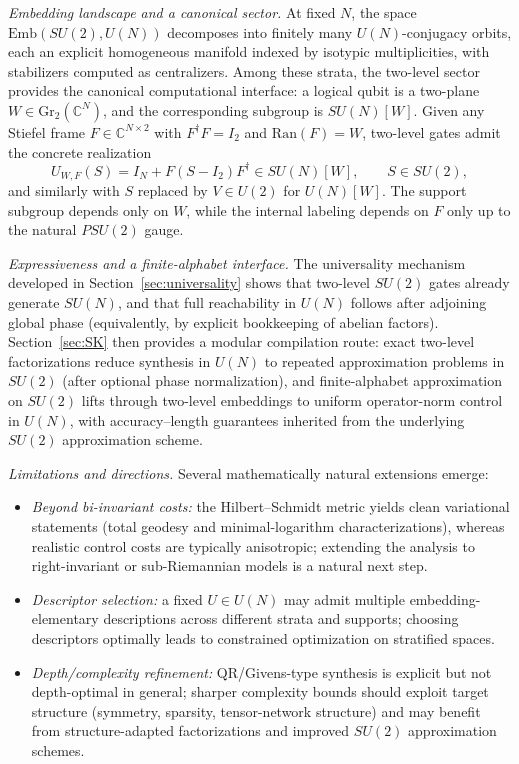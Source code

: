 \documentclass{article}%
\theoremstyle{definition}
\numberwithin{equation}{section}
\newcommand{\C}{\mathbb{C}}
\newcommand{\Gr}{\mathrm{Gr}}
\newcommand{\Emb}{\mathrm{Emb}}
\newcommand{\Ran}{\mathrm{Ran}}
\begin{document}
\smallskip
\noindent\emph{Embedding landscape and a canonical sector.}
At fixed $N$, the space $\Emb(SU(2),U(N))$ decomposes into finitely many $U(N)$-conjugacy orbits, each an explicit homogeneous manifold
indexed by isotypic multiplicities, with stabilizers computed as centralizers.
Among these strata, the two-level sector provides the canonical computational interface: a logical qubit is a two-plane
$W\in\Gr_2(\C^N)$, and the corresponding subgroup is $SU(N)[W]$.
Given any Stiefel frame $F\in\C^{N\times 2}$ with $F^\dagger F=I_2$ and $\Ran(F)=W$, two-level gates admit the concrete realization
\begin{equation}\label{eq:conclusion_two_level_realization}
U_{W,F}(S)=I_N+F(S-I_2)F^\dagger\in SU(N)[W],\qquad S\in SU(2),
\end{equation}
and similarly with $S$ replaced by $V\in U(2)$ for $U(N)[W]$.
The support subgroup depends only on $W$, while the internal labeling depends on $F$ only up to the natural $PSU(2)$ gauge.

\smallskip
\noindent\emph{Expressiveness and a finite-alphabet interface.}
The universality mechanism developed in Section~\ref{sec:universality} shows that two-level $SU(2)$ gates already generate $SU(N)$, and
that full reachability in $U(N)$ follows after adjoining global phase (equivalently, by explicit bookkeeping of abelian factors).
Section~\ref{sec:SK} then provides a modular compilation route: exact two-level factorizations reduce synthesis in $U(N)$ to repeated
approximation problems in $SU(2)$ (after optional phase normalization), and finite-alphabet approximation on $SU(2)$ lifts through
two-level embeddings to uniform operator-norm control in $U(N)$, with accuracy--length guarantees inherited from the underlying
$SU(2)$ approximation scheme.

\smallskip
\noindent\emph{Limitations and directions.}
Several mathematically natural extensions emerge:
\begin{itemize}
\item \emph{Beyond bi-invariant costs:} the Hilbert--Schmidt metric yields clean variational statements (total geodesy and
minimal-logarithm characterizations), whereas realistic control costs are typically anisotropic; extending the analysis to
right-invariant or sub-Riemannian models is a natural next step.
\item \emph{Descriptor selection:} a fixed $U\in U(N)$ may admit multiple embedding-elementary descriptions across different strata and
supports; choosing descriptors optimally leads to constrained optimization on stratified spaces.
\item \emph{Depth/complexity refinement:} QR/Givens-type synthesis is explicit but not depth-optimal in general; sharper complexity bounds
should exploit target structure (symmetry, sparsity, tensor-network structure) and may benefit from structure-adapted factorizations and
improved $SU(2)$ approximation schemes.
\end{itemize}
\end{document}
